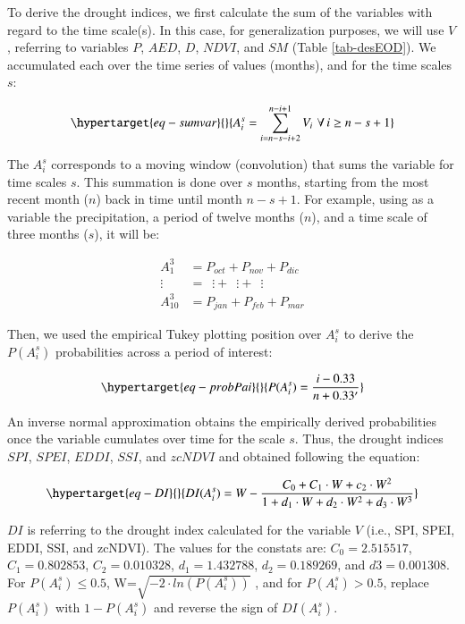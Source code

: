\documentclass[
  authoryear,
  preprint,
  3p,
  onecolumn]{elsarticle}
\begin{document}
To derive the drought indices, we first calculate the sum of the
variables with regard to the time scale(s). In this case, for
generalization purposes, we will use \(V\), referring to variables
\(P\), \(AED\), \(D\), \(NDVI\), and \(SM\) (Table \ref{tab-desEOD}). We
accumulated each over the time series of values (months), and for the
time scales \(s\):

\begin{equation}\protect\hypertarget{eq-sumvar}{}{A^s_i = \sum_{i=n-s-i+2}^{n-i+1} V_i\,\, \forall\, i\geq n-s+1  }\label{eq-sumvar}\end{equation}

The \(A^s_i\) corresponds to a moving window (convolution) that sums the
variable for time scales \(s\). This summation is done over \(s\)
months, starting from the most recent month (\(n\)) back in time until
month \(n-s+1\). For example, using as a variable the precipitation, a
period of twelve months (\(n\)), and a time scale of three months
(\(s\)), it will be:

\[
\begin{split}
A^3_1 &= P_{oct} +P_{nov} +P_{dic} \\
\vdots\,\,\, &= \,\,\,\vdots + \,\,\,\vdots + \,\,\,\vdots \\
A^3_{10} &= P_{jan}+P_{feb} +P_{mar}
\end{split}
\]

Then, we used the empirical Tukey plotting position \citep{Wilks2011}
over \(A_i^s\) to derive the \(P(A_i^s)\) probabilities across a period
of interest:

\begin{equation}\protect\hypertarget{eq-probPai}{}{P(A^s_i) = \frac{i-0.33}{n+0.33'}}\label{eq-probPai}\end{equation}

An inverse normal approximation \citep{Abramowitz1968} obtains the
empirically derived probabilities once the variable cumulates over time
for the scale \(s\). Thus, the drought indices \(SPI\), \(SPEI\),
\(EDDI\), \(SSI\), and \(zcNDVI\) and obtained following the equation:

\begin{equation}\protect\hypertarget{eq-DI}{}{DI(A^s_i) = W - \frac{C_0+C_1\cdot W + c_2 \cdot W^2}{1+d_1\cdot W +d_2\cdot W^2 +d_3\cdot W^3}}\label{eq-DI}\end{equation}

\(DI\) is referring to the drought index calculated for the variable
\(V\) (i.e., SPI, SPEI, EDDI, SSI, and zcNDVI). The values for the
constats are: \(C_0 = 2.515517\), \(C_1 = 0.802853\),
\(C_2 = 0.010328\), \(d_1 = 1.432788\), \(d_2 = 0.189269\), and
\(d3 = 0.001308\). For \(P(A^s_i) \leq 0.5\),
W=\(\sqrt{-2\cdot ln(P(A^s_i))}\) , and for \(P(A^s_i) > 0.5\), replace
\(P(A^s_i)\) with \(1-P(A^s_i)\) and reverse the sign of \(DI(A^s_i)\).
\end{document}
